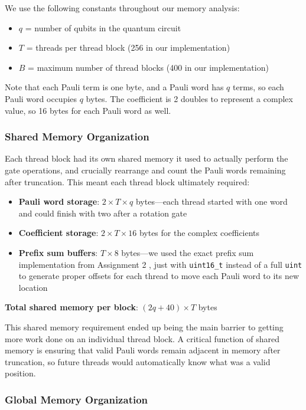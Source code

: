 \documentclass[11pt, a4paper]{article}
\begin{document}
We use the following constants throughout our memory analysis:
\begin{itemize}
    \item $q$ = number of qubits in the quantum circuit
    \item $T$ = threads per thread block (256 in our implementation)
    \item $B$ = maximum number of thread blocks (400 in our implementation)
\end{itemize}

Note that each Pauli term is one byte, and a Pauli word has $q$ terms, so each Pauli word occupies $q$ bytes. The coefficient is 2 doubles to represent a complex value, so 16 bytes for each Pauli word as well.

\subsubsection{Shared Memory Organization}

Each thread block had its own shared memory it used to actually perform the gate operations, and crucially rearrange and count the Pauli words remaining after truncation. This meant each thread block ultimately required:

\begin{itemize}
    \item \textbf{Pauli word storage}: $2 \times T \times q$ bytes---each thread started with one word and could finish with two after a rotation gate
    \item \textbf{Coefficient storage}: $2 \times T \times 16$ bytes for the complex coefficients
    \item \textbf{Prefix sum buffers}: $T \times 8$ bytes---we used the exact prefix sum implementation from Assignment 2 \cite{cmu418}, just with \texttt{uint16\_t} instead of a full \texttt{uint} to generate proper offsets for each thread to move each Pauli word to its new location
\end{itemize}

\textbf{Total shared memory per block}: $(2q + 40) \times T$ bytes

This shared memory requirement ended up being the main barrier to getting more work done on an individual thread block. A critical function of shared memory is ensuring that valid Pauli words remain adjacent in memory after truncation, so future threads would automatically know what was a valid position.

\subsubsection{Global Memory Organization}
\end{document}
